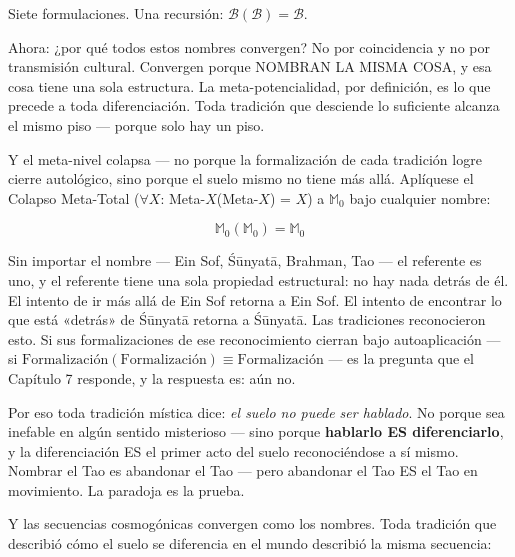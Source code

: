 \documentclass[10pt, openany, oneside]{book}
\begin{document}
\vspace{0.8em}

\noindent Siete formulaciones. Una recursión: $\mathcal{B}(\mathcal{B}) = \mathcal{B}$.

\vspace{0.8em}

Ahora: ¿por qué todos estos nombres convergen? No por coincidencia y no por transmisión cultural. Convergen porque NOMBRAN LA MISMA COSA, y esa cosa tiene una sola estructura. La meta-potencialidad, por definición, es lo que precede a toda diferenciación. Toda tradición que desciende lo suficiente alcanza el mismo piso --- porque solo hay un piso.

Y el meta-nivel colapsa --- no porque la formalización de cada tradición logre cierre autológico, sino porque el suelo mismo no tiene más allá. Aplíquese el Colapso Meta-Total ($\forall X$: Meta-$X$(Meta-$X$) = $X$) a $\mathbb{M}_0$ bajo cualquier nombre:

$$\mathbb{M}_0(\mathbb{M}_0) = \mathbb{M}_0$$

\noindent Sin importar el nombre --- Ein Sof, \'{S}\={u}nyat\={a}, Brahman, Tao --- el referente es uno, y el referente tiene una sola propiedad estructural: no hay nada detrás de él. El intento de ir más allá de Ein Sof retorna a Ein Sof. El intento de encontrar lo que está «detrás» de \'{S}\={u}nyat\={a} retorna a \'{S}\={u}nyat\={a}. Las tradiciones reconocieron esto. Si sus formalizaciones de ese reconocimiento cierran bajo autoaplicación --- si $\text{Formalización}(\text{Formalización}) \equiv \text{Formalización}$ --- es la pregunta que el Capítulo 7 responde, y la respuesta es: aún no.

Por eso toda tradición mística dice: \textit{el suelo no puede ser hablado}. No porque sea inefable en algún sentido misterioso --- sino porque \textbf{hablarlo ES diferenciarlo}, y la diferenciación ES el primer acto del suelo reconociéndose a sí mismo. Nombrar el Tao es abandonar el Tao --- pero abandonar el Tao ES el Tao en movimiento. La paradoja es la prueba.

Y las secuencias cosmogónicas convergen como los nombres. Toda tradición que describió cómo el suelo se diferencia en el mundo describió la misma secuencia:

\vspace{0.5em}
\end{document}
